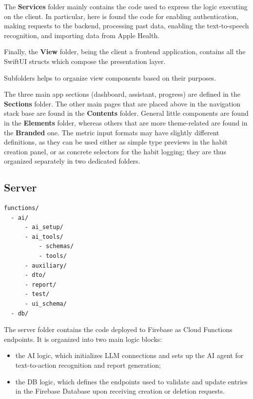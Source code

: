 \documentclass{article}
\newcommand{\newpar}[0]{\vspace{2mm}\noindent}
\begin{document}
\newpar
The \textbf{Services} folder mainly contains the code used to express the logic executing on the client.
In particular, here is found the code for enabling authentication, making requests to the backend, processing past data, enabling the text-to-speech recognition, and importing data from Apple Health.

\newpar
Finally, the \textbf{View} folder, being the client a frontend application, contains all the SwiftUI structs which compose the presentation layer.

Subfolders helps to organize view components based on their purposes.

The three main app sections (dashboard, assistant, progress) are defined in the \textbf{Sections} folder.
The other main pages that are placed above in the navigation stack base are found in the \textbf{Contents} folder.
General little components are found in the \textbf{Elements} folder, whereas others that are more theme-related are found in the \textbf{Branded} one.
The metric input formats may have slightly different definitions, as they can be used either as simple type previews in the habit creation panel, or as concrete selectors for the habit logging; they are thus organized separately in two dedicated folders.

\subsection{Server}

\begin{verbatim}
functions/
  - ai/
      - ai_setup/
      - ai_tools/
          - schemas/
          - tools/
      - auxiliary/
      - dto/
      - report/
      - test/
      - ui_schema/
  - db/
\end{verbatim}

\newpar
The server folder contains the code deployed to Firebase as Cloud Functions endpoints.
It is organized into two main logic blocks:

\begin{itemize}
	\item the AI logic, which initializes LLM connections and sets up the AI agent for text-to-action recognition and report generation;
	\item the DB logic, which defines the endpoints used to validate and update entries in the Firebase Database upon receiving creation or deletion requests.
\end{itemize}

\newpar 
\end{document}
